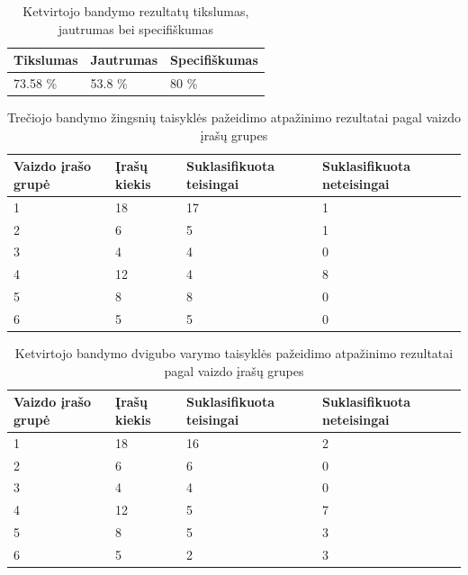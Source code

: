 \documentclass{VUMIFPSbakalaurinis}
\begin{document}
\begin{table}[H]\footnotesize
	\centering
	\caption{Ketvirtojo bandymo rezultatų tikslumas, jautrumas bei specifiškumas}
	{\begin{tabular}{|p{5cm}|p{5cm}|p{5cm}|} \hline
			\textbf{Tikslumas} & \textbf{Jautrumas} & \textbf{Specifiškumas} \\
			\hline
			73.58 \%  & 53.8 \%    & 80 \%    \\
			
			\hline
	\end{tabular}}
	\label{tab:fourth_trial_percents}
\end{table}

\begin{table}[H]\footnotesize
	\centering
	\caption{Trečiojo bandymo žingsnių taisyklės pažeidimo atpažinimo rezultatai pagal vaizdo įrašų grupes}
	{\begin{tabular}{|p{3cm}|p{3cm}|p{3cm}|p{3cm}|} \hline
			\textbf{Vaizdo įrašo grupė} & \textbf{Įrašų kiekis} & \textbf{Suklasifikuota teisingai} & \textbf{Suklasifikuota neteisingai} \\
			\hline
			1  & 18    & 17    & 1    \\
			\hline
			2  & 6    & 5  & 1     \\
			\hline
			3  & 4    & 4   & 0    \\
			\hline
			4  & 12    & 4  & 8     \\
			\hline
			5  & 8    & 8  & 0     \\
			\hline
			6  & 5    & 5  & 0    \\
			\hline
	\end{tabular}}
	\label{tab:third_trial_recognizion_results_grouped}
\end{table}

\begin{table}[H]\footnotesize
	\centering
	\caption{Ketvirtojo bandymo dvigubo varymo taisyklės pažeidimo atpažinimo rezultatai pagal vaizdo įrašų grupes}
	{\begin{tabular}{|p{3cm}|p{3cm}|p{3cm}|p{3cm}|} \hline
			\textbf{Vaizdo įrašo grupė} & \textbf{Įrašų kiekis} & \textbf{Suklasifikuota teisingai} & \textbf{Suklasifikuota neteisingai} \\
			\hline
			1  & 18    & 16    & 2    \\
			\hline
			2  & 6    & 6  & 0     \\
			\hline
			3  & 4    & 4   & 0    \\
			\hline
			4  & 12    & 5  & 7     \\
			\hline
			5  & 8    & 5  & 3     \\
			\hline
			6  & 5    & 2  & 3     \\
			\hline
	\end{tabular}}
	\label{tab:fourth_trial_recognizion_results_grouped}
\end{table}
\end{document}
